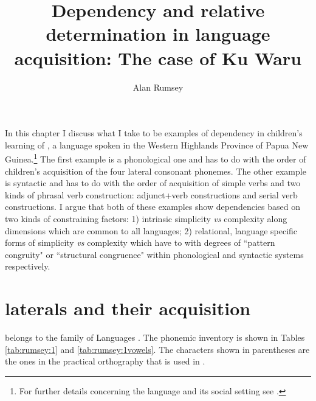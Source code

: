 \documentclass[output=paper]{langsci/langscibook}
\title{Dependency and relative determination in language acquisition: The case of {Ku Waru}}
\author{Alan Rumsey\affiliation{Australian National University}
}
\begin{document}
\maketitle

    
\noindent In this chapter I discuss what I take to be examples of dependency in children’s learning of , a  language spoken in the Western Highlands Province of Papua New Guinea.\footnote{For further details concerning the  language and its social setting see \citet{Merlan1991}.} The first example is a phonological one and has to do with the order of children’s acquisition of the four  lateral consonant phonemes. The other example is syntactic and has to do with the order of acquisition of simple verbs and two kinds of phrasal verb construction: adjunct+verb constructions and serial verb constructions. I argue that both of these examples show dependencies based on two kinds of constraining factors: 1) intrinsic simplicity \textit{vs} complexity along dimensions which are common to all languages; 2) relational, language specific forms of simplicity \textit{vs} complexity which have to with degrees of ``pattern congruity" or ``structural congruence" within phonological and syntactic systems respectively.   

\section{ laterals and their acquisition}

 belongs to the  family of  Languages \citep{Pawley2009}. The  phonemic inventory is shown in Tables \ref{tab:rumsey:1} and \ref{tab:rumsey:1vowels}.  The characters shown in parentheses are the ones in the practical orthography that is used in .
\end{document}

